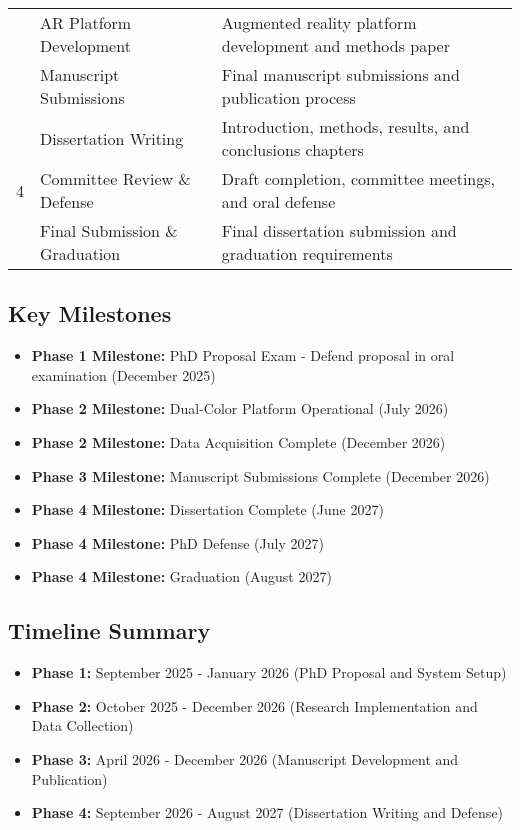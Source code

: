 \begin{center}
\begin{tabularx}{\textwidth}{|c|X|X|}
\cline{2-3}
& AR Platform Development & Augmented reality platform development and methods paper \\
\cline{2-3}
& Manuscript Submissions & Final manuscript submissions and publication process \\
\hline
\multirow{3}{*}{4} & Dissertation Writing & Introduction, methods, results, and conclusions chapters \\
\cline{2-3}
& Committee Review \& Defense & Draft completion, committee meetings, and oral defense \\
\cline{2-3}
& Final Submission \& Graduation & Final dissertation submission and graduation requirements \\
\hline
\end{tabularx}
\end{center}

\vspace{1em}

\subsection*{Key Milestones}
\begin{itemize}
\item \textbf{Phase 1 Milestone:} PhD Proposal Exam - Defend proposal in oral examination (December 2025)
\item \textbf{Phase 2 Milestone:} Dual-Color Platform Operational (July 2026)
\item \textbf{Phase 2 Milestone:} Data Acquisition Complete (December 2026)
\item \textbf{Phase 3 Milestone:} Manuscript Submissions Complete (December 2026)
\item \textbf{Phase 4 Milestone:} Dissertation Complete (June 2027)
\item \textbf{Phase 4 Milestone:} PhD Defense (July 2027)
\item \textbf{Phase 4 Milestone:} Graduation (August 2027)
\end{itemize}

\vspace{1em}

\subsection*{Timeline Summary}
\begin{itemize}
\item \textbf{Phase 1:} September 2025 - January 2026 (PhD Proposal and System Setup)
\item \textbf{Phase 2:} October 2025 - December 2026 (Research Implementation and Data Collection)
\item \textbf{Phase 3:} April 2026 - December 2026 (Manuscript Development and Publication)
\item \textbf{Phase 4:} September 2026 - August 2027 (Dissertation Writing and Defense)
\end{itemize}

\pagebreak

\pagebreak